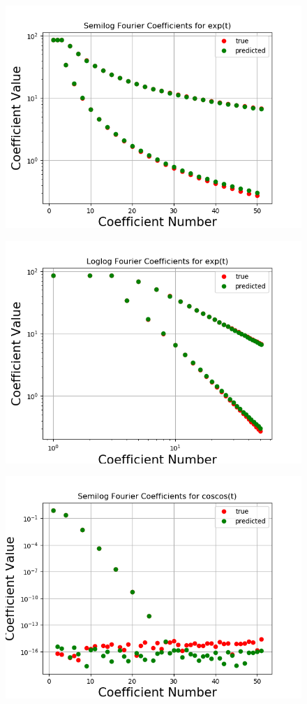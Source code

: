 \documentclass[11pt, a4paper]{article}
\begin{document}
\begin{figure}[!tbh]
   	\centering
   	\includegraphics[scale=0.5]{Figure_32.png}
   	\label{fig:32}
   \end{figure}
\begin{figure}[!tbh]
   	\centering
   	\includegraphics[scale=0.5]{Figure_42.png}
   	\label{fig:42}
   \end{figure}
\begin{figure}[!tbh]
   	\centering
   	\includegraphics[scale=0.5]{Figure_52.png}
   	\label{fig:52}
   \end{figure}
\end{document}

